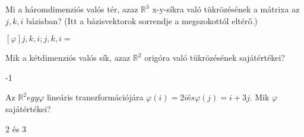 \begin{frame}
  \begin{tcolorbox}[title={9/2. {\symrook}}]
    Mi a háromdimenziós valós tér, azaz $\mathbb{R}^3$ x-y-síkra való tükrözésének a mátrixa az $j,k,i$ bázisban? (Itt a bázisvektorok sorrendje a megszokottól eltérő.)

  \tcblower

    \mmedskip 
    
     $[{\varphi}]j,k,i;j,k,i =$
  \end{tcolorbox}
\end{frame}


\begin{frame}
  \begin{tcolorbox}[title={9/3. {\symknight}}]
    Mik a kétdimenziós valós sík, azaz $\mathbb{R}^2$ origóra való tükrözésének sajátértékei?

  \tcblower

    \mmedskip 
    
    -1
  \end{tcolorbox}
\end{frame}


\begin{frame}
  \begin{tcolorbox}[title={9/4. {\symrook}}]
    Az $\mathbb{R}^2 egy {\varphi}$ lineáris transzformációjára ${\varphi}(i) = 2i és {\varphi}(j) = i + 3j$. Mik ${\varphi}$ sajátértékei? 
    
  \tcblower

    \mmedskip 
    
     2 és 3
  \end{tcolorbox}
\end{frame}



